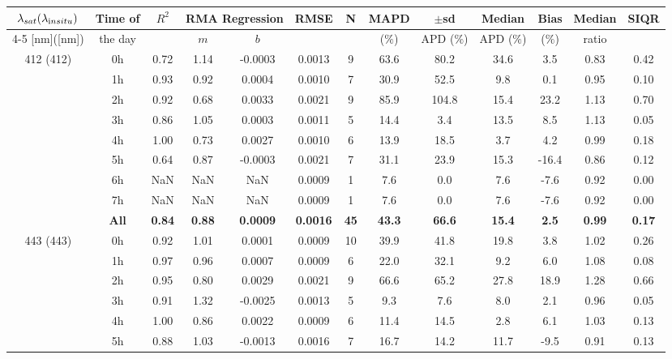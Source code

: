 \documentclass[preview]{standalone}
\begin{document}
\tiny

\tiny
\centering
\begin{tabular}{ccccccccccccc} 
 \hline 
$\lambda_{sat} (\lambda_{\text in situ})$ & Time of & $R^2$ & \multicolumn{2}{c}{RMA Regression} & RMSE & N & MAPD & $\pm$sd & Median & Bias & Median & SIQR \\ \cline{4-5}
[nm]([nm])                  &  the day            &         & $m$     & $b$     &             &     & ($\%$)  & APD ($\%$)  & APD ($\%$)  & ($\%$)   & ratio   &         \\ \hline 
\multirow{9}{*}{412 (412)} & 0h & 0.72 & 1.14 & -0.0003 & 0.0013 &  9 & 63.6 & 80.2 & 34.6 & 3.5 & 0.83 & 0.42 \\ 
 & 1h  & 0.93 & 0.92 & 0.0004 & 0.0010 &  7 & 30.9 & 52.5 & 9.8 & 0.1 & 0.95 & 0.10 \\ 
 & 2h  & 0.92 & 0.68 & 0.0033 & 0.0021 &  9 & 85.9 & 104.8 & 15.4 & 23.2 & 1.13 & 0.70 \\ 
 & 3h  & 0.86 & 1.05 & 0.0003 & 0.0011 &  5 & 14.4 & 3.4 & 13.5 & 8.5 & 1.13 & 0.05 \\ 
 & 4h  & 1.00 & 0.73 & 0.0027 & 0.0010 &  6 & 13.9 & 18.5 & 3.7 & 4.2 & 0.99 & 0.18 \\ 
 & 5h  & 0.64 & 0.87 & -0.0003 & 0.0021 &  7 & 31.1 & 23.9 & 15.3 & -16.4 & 0.86 & 0.12 \\ 
 & 6h  & NaN & NaN & NaN & 0.0009 &  1 & 7.6 & 0.0 & 7.6 & -7.6 & 0.92 & 0.00 \\ 
 & 7h  & NaN & NaN & NaN & 0.0009 &  1 & 7.6 & 0.0 & 7.6 & -7.6 & 0.92 & 0.00 \\ \cline{2-13}
 & \textbf{All} & \textbf{0.84} & \textbf{0.88} & \textbf{0.0009} & \textbf{0.0016} & \textbf{45} & \textbf{43.3} & \textbf{66.6} & \textbf{15.4} & \textbf{2.5} & \textbf{0.99} & \textbf{0.17} \\ \hline
\multirow{9}{*}{443 (443)} & 0h  & 0.92 & 1.01 & 0.0001 & 0.0009 & 10 & 39.9 & 41.8 & 19.8 & 3.8 & 1.02 & 0.26 \\ 
& 1h   & 0.97 & 0.96 & 0.0007 & 0.0009 &  6 & 22.0 & 32.1 & 9.2 & 6.0 & 1.08 & 0.08 \\ 
& 2h   & 0.95 & 0.80 & 0.0029 & 0.0021 &  9 & 66.6 & 65.2 & 27.8 & 18.9 & 1.28 & 0.66 \\ 
& 3h   & 0.91 & 1.32 & -0.0025 & 0.0013 &  5 & 9.3 & 7.6 & 8.0 & 2.1 & 0.96 & 0.05 \\ 
& 4h   & 1.00 & 0.86 & 0.0022 & 0.0009 &  6 & 11.4 & 14.5 & 2.8 & 6.1 & 1.03 & 0.13 \\ 
& 5h   & 0.88 & 1.03 & -0.0013 & 0.0016 &  7 & 16.7 & 14.2 & 11.7 & -9.5 & 0.91 & 0.13 \\ 

\end{tabular}
\end{document}

